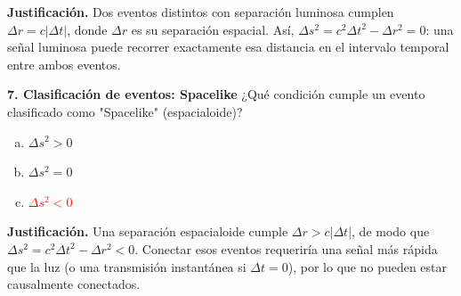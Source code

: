 \textbf{Justificación.} Dos eventos distintos con separación luminosa cumplen $\Delta r=c|\Delta t|$, donde $\Delta r$ es su separación espacial. Así, $\Delta s^2=c^2\Delta t^2-\Delta r^2=0$: una señal luminosa puede recorrer exactamente esa distancia en el intervalo temporal entre ambos eventos.

\textbf{7. Clasificación de eventos: Spacelike}
¿Qué condición cumple un evento clasificado como "Spacelike" (espacialoide)?
\begin{enumerate}[a)]
    \item $\Delta s^2 > 0$
    \item $\Delta s^2 = 0$
    \item \textcolor{red}{$\Delta s^2 < 0$}
\end{enumerate}

\textbf{Justificación.} Una separación espacialoide cumple $\Delta r>c|\Delta t|$, de modo que $\Delta s^2=c^2\Delta t^2-\Delta r^2<0$. Conectar esos eventos requeriría una señal más rápida que la luz (o una transmisión instantánea si $\Delta t=0$), por lo que no pueden estar causalmente conectados.